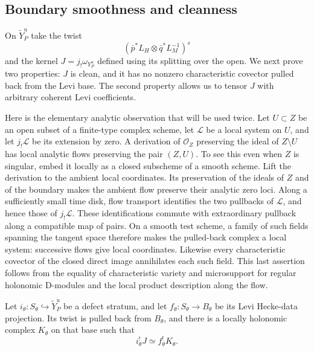 \subsection{Boundary smoothness and cleanness}

On $\widetilde Y_P^u$ take the twist
\[
 (\bar p^*L_H\otimes\bar q^*L_M^{-1})^s
\]
and the kernel $J=j_!\omega_{Y_P^u}$ defined using its splitting over the open.
We next prove two properties: $J$ is clean, and it has no nonzero
characteristic covector pulled back from the Levi base.  The second property
allows us to tensor $J$ with arbitrary coherent Levi coefficients.

Here is the elementary analytic observation that will be used twice.  Let
$U\subset Z$ be an open subset of a finite-type complex scheme, let
$\mathcal L$ be a local system on $U$, and let $j_!\mathcal L$ be its extension
by zero.  A derivation of $\mathcal O_Z$ preserving the ideal of $Z\setminus U$
has local analytic flows preserving the pair $(Z,U)$.  To see this even when
$Z$ is singular, embed it locally as a closed subscheme of a smooth scheme.
Lift the derivation to the ambient local coordinates.  Its preservation of
the ideals of $Z$ and of the boundary makes the ambient flow preserve their
analytic zero loci.  Along a sufficiently small time disk, flow transport
identifies the two pullbacks of $\mathcal L$, and hence those of
$j_!\mathcal L$.  These identifications commute with extraordinary pullback
along a compatible map of pairs.  On a smooth test scheme, a family of such
fields spanning the tangent space therefore makes the pulled-back complex
a local system: successive flows give local coordinates.  Likewise every
characteristic covector of the closed direct image annihilates each such
field.  This last assertion follows from the equality of characteristic
variety and microsupport for regular holonomic D-modules
\cite[Theorem~11.3.3]{KashiwaraSchapira} and the local product description
along the flow.

\begin{lemma}\label{pseudo:fiber-descent}
Let $i_\theta:S_\theta\hookrightarrow\widetilde Y_P^u$ be a defect stratum,
and let $f_\theta:S_\theta\to B_\theta$ be its Levi Hecke-data projection.
Its twist is pulled back from $B_\theta$, and there is a locally holonomic
complex $K_\theta$ on that base such that
\begin{equation}\label{eq:M2}
 i_\theta^!J\simeq f_\theta^!K_\theta.
\end{equation}
\end{lemma}

